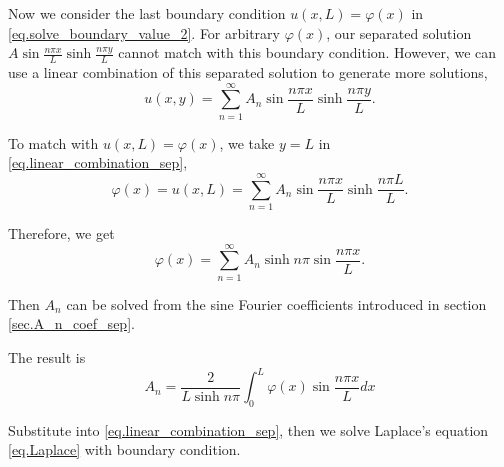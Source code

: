 Now we consider the last boundary condition $u(x, L)=\varphi(x)$ in \eqref{eq.solve_boundary_value_2}. For arbitrary $\varphi(x)$, our separated solution $A \sin \frac{n \pi x}{L} \sinh \frac{n \pi y}{L}$ cannot match with this boundary condition. However, we can use a linear combination of this separated solution to generate more solutions,
\begin{equation}\label{eq.linear_combination_sep}
u(x, y)=\sum_{n = 1}^{\infty} A_n \sin \frac{n \pi x}{L} \sinh \frac{n \pi y}{L}.
\end{equation}

To match with $u(x, L)=\varphi(x)$, we take $y = L$ in \eqref{eq.linear_combination_sep},
\begin{equation}\label{eq.match_boundary}
\varphi(x) = u(x, L)=\sum_{n = 1}^{\infty} A_n \sin \frac{n \pi x}{L} \sinh \frac{n \pi L}{L}.
\end{equation}

Therefore, we get 
\begin{equation}\label{eq.match_boundary_1}
\varphi(x) =\sum_{n = 1}^{\infty}  A_n \sinh n \pi \sin \frac{n \pi x}{L}.
\end{equation}

Then $A_n$ can be solved from the sine Fourier coefficients introduced in section \ref{sec.A_n_coef_sep}.

The result is 
\begin{equation}\label{eq.solve_A_n}
    A_n = \frac{2}{L\sinh n\pi}\int_{0}^{L}\varphi(x)\sin \frac{n \pi x}{L} dx
\end{equation}

Substitute into \eqref{eq.linear_combination_sep}, then we solve Laplace's equation \eqref{eq.Laplace} with boundary condition.


